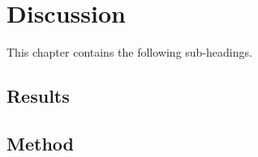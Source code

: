 \chapter{Discussion}
\label{cha:discussion}

%
%











This chapter contains the following sub-headings.

\section{Results}
\label{sec:discussion-results}


\section{Method}
\label{sec:discussion-method}

